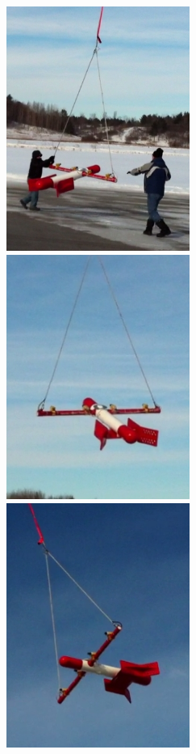 \begin{figure}[h]
\centering
\includegraphics[width=6cm,keepaspectratio=true]{./Figures/SUAS_TAKEOFF2.jpg}
\includegraphics[width=6cm,keepaspectratio=true]{./Figures/SUAS_TAKEOFF3.jpg}
\includegraphics[width=6cm,keepaspectratio=true]{./Figures/SUAS_TAKEOFF4.jpg}

\end{figure}
